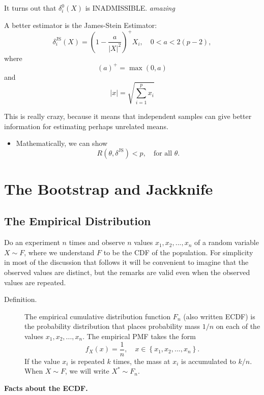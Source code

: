 \documentclass[captions=tableheading]{scrbook}
\begin{document}
It turns out that $\delta_{i}^{0}(X)$ is INADMISSIBLE.  \emph{amazing}

A better estimator is the James-Stein Estimator:
\[
\delta_{i}^{\mathrm{JS}}(X) = \left(1 - \frac{a}{|X|^{2}} \right)^{+} X_{i}, \quad 0 < a < 2(p - 2),
\]
where
\[
(a)^{+} = \max (0, a)
\]
and
\[
 | x | = \sqrt{\sum_{i=1}^{p}x_{i}}
\]

This is really crazy, because it means that independent samples can give better information for estimating perhaps unrelated means.


\begin{itemize}
\item Mathematically, we can show
  \[
  R(\theta,\delta^{\mathrm{JS}}) < p,\quad \mbox{for all $\theta$.}
  \]
\end{itemize}
\chapter{The Bootstrap and Jackknife}
\label{sec-4}
\section{The Empirical Distribution}
\label{sec-4_1}


Do an experiment $n$ times and observe $n$ values \(x_{1}, x_{2}, ..., x_{n}\) of a random variable \(X \sim F\), where we understand $F$ to be the CDF of the population. For simplicity in most of the discussion that follows it will be convenient to imagine that the observed values are distinct, but the remarks are valid even when the observed values are repeated. 


\begin{description}
\item[Definition.] The empirical cumulative distribution function \(F_{n}\) (also written ECDF) is the probability distribution that places probability mass \(1/n\) on each of the values \(x_{1}, x_{2}, ..., x_{n}\). The empirical PMF takes the form 
  \begin{equation*}
  f_{X}(x)=\frac{1}{n},\quad x\in\left\{ x_{1},x_{2},...,x_{n}\right\}.
  \end{equation*}
  If the value \(x_{i}\) is repeated \(k\) times, the mass at \(x_{i}\) is accumulated to \(k/n\).  When $X \sim F$, we will write $X^{\ast} \sim F_{n}$.
\end{description}

\bigskip
\textbf{Facts about the ECDF.}
\end{document}
